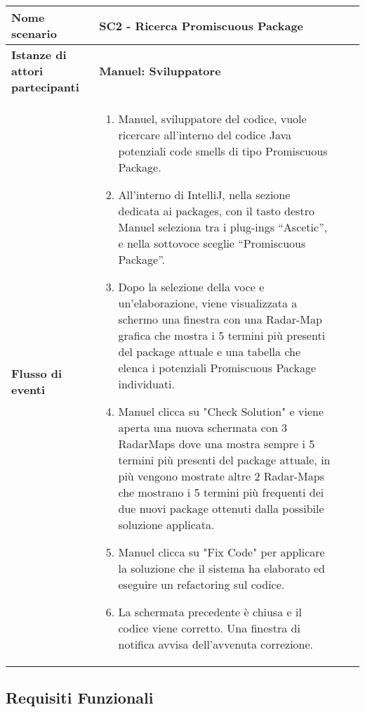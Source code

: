 \begin{tabular}{|l|p{8cm}|p{1cm}|p{1.1cm}|}
	\hline
	\textbf{Nome scenario}  & \textbf{SC2 - Ricerca Promiscuous Package} \\ \hline
	\textbf{Istanze di attori partecipanti}  & \textbf{Manuel: Sviluppatore} \\ \hline
	\textbf{Flusso di eventi}  & 
		\begin{enumerate}
		\item Manuel, sviluppatore del codice, vuole ricercare all’interno del codice Java potenziali code smells di tipo Promiscuous Package.
		
		\item All’interno di IntelliJ, nella sezione dedicata ai packages, con il tasto destro Manuel seleziona tra i plug-ings “Ascetic”, e nella sottovoce sceglie “Promiscuous Package”. 
		
		\item Dopo la selezione della voce e un'elaborazione, viene visualizzata a schermo una finestra con una Radar-Map grafica che mostra i 5 termini più presenti del package attuale e una tabella che elenca i potenziali Promiscuous Package individuati. 
		
		\item Manuel clicca su "Check Solution" e viene aperta una nuova schermata con 3 RadarMaps dove una mostra sempre i 5 termini più presenti del package attuale, in più vengono mostrate altre 2 Radar-Maps che mostrano i 5 termini più frequenti dei due nuovi package ottenuti dalla possibile soluzione applicata.
		
		\item Manuel clicca su "Fix Code" per applicare la soluzione che il sistema ha elaborato ed eseguire un refactoring sul codice.
		
		\item La schermata precedente è chiusa e il codice viene corretto. Una finestra di notifica avvisa dell'avvenuta correzione.
		
		\end{enumerate}\\ \hline
\end{tabular}

\newpage
		\subsection{Requisiti Funzionali}
		
